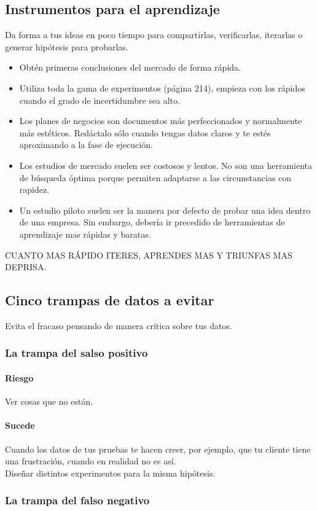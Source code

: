 \documentclass[11pt]{book}
\begin{document}
\subsection{Instrumentos para el aprendizaje}
Da forma a tus ideas en poco tiempo para compartirlas, verificarlas, iterarlas o generar hipótesis para probarlas. 
\begin{itemize}
\item Obtén primeras conclusiones del mercado de forma rápida.
\item Utiliza toda la gama de experimentos (página 214), empieza con los rápidos cuando el grado de incertidumbre sea alto.
\item Los planes de negocios son documentos más perfeccionados y normalmente más estéticos. Redáctalo sólo cuando tengas datos claros y te estés aproximando a la fase de ejecución.
\item Los estudios de mercado suelen ser costosos y lentos. No son una herramienta de búsqueda óptima porque permiten adaptarse a las circunstancias con rapidez.
\item Un estudio piloto suelen ser la manera por defecto de probar una idea dentro de una empresa. Sin embargo, debería ir precedido de herramientas de aprendizaje mas rápidas y baratas.
\end{itemize}
CUANTO MAS RÁPIDO ITERES, APRENDES MAS Y TRIUNFAS MAS DEPRISA.
\subsection{Cinco trampas de datos a evitar}
Evita el fracaso pensando de manera crítica sobre tus datos. 
\subsubsection{La trampa del salso positivo}
\paragraph{Riesgo}
Ver cosas que no están.
\paragraph{Sucede}
Cuando los datos de tus pruebas te hacen creer, por ejemplo, que tu cliente tiene una frustración, cuando en realidad no es así. \\
Diseñar distintos experimentos para la misma hipótesis.
\subsubsection{La trampa del falso negativo}
\end{document}
